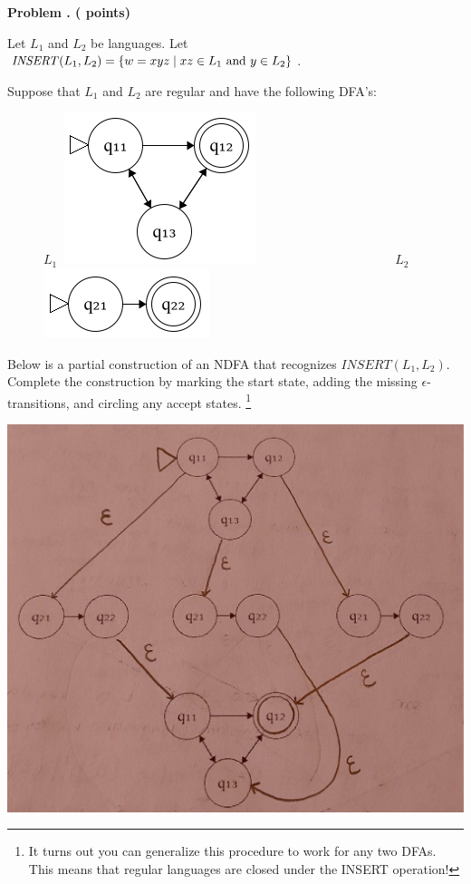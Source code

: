 





\newpage
\addtocounter{problemctr}{1}
\noindent
{\bf
Problem \theproblemctr.  (\theinsert \xspace points)}
\swallow{ (\theinserttime\xspace minutes)}

\smallskip

\noindent
Let $L_1$ and $L_2$ be languages.
Let
\(
\mbox{\textit{INSERT}}(L_1, L_2) =
\{w = xyz \mid xz \in L_1 \mbox{ and } y \in L_2\}
\).

\bigskip

\noindent Suppose that $L_1$ and $L_2$ are regular and have the following DFA's:

\bigskip

\begin{figure}[h]
$L_{1}$~\includegraphics[scale=.5]{dfa1.png}~~~~~~~~~~~~~~~~~~~~~~$L_2$\includegraphics[scale=.5]{dfa2.png}
\centering
\end{figure}


\noindent Below is a partial construction of an NDFA that recognizes $INSERT(L_1,L_2)$. Complete the construction by marking the start state, adding the missing $\epsilon$-transitions, and circling any accept states. \footnote{It turns out you can generalize this procedure to work for any two DFAs. This means that regular languages are closed under the INSERT operation!}

\includegraphics[scale=.4]{insert.jpg}


